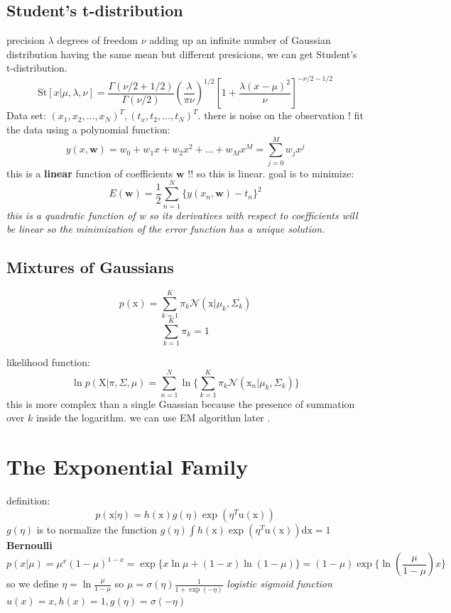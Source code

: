 \documentclass[a4paper]{book}
\renewcommand{\bf}{\mathbf}
\begin{document}
\subsection{Student's t-distribution}
precision $\lambda$    degrees of freedom $\nu$\newline
adding up an infinite number of Gaussian distribution having the same mean but different presicions, we can get Student's t-distribution.
$$\mathrm {St}[x|\mu,\lambda,\nu] = \frac{\Gamma(\nu/2+1/2)}{\Gamma(\nu/2)}{(\frac{\lambda}{\pi\nu})^{1/2}}[1+\frac{\lambda(x-\mu)^2}{\nu}]^{-\nu/2-1/2}$$
Data set: $(x_1,x_2,...,x_N)^T, (t_x,t_2,...,t_N)^T$.\newline
there is noise on the observation !
fit the data using a polynomial function:
\begin{equation}\label{2.1}
y(x, \textbf{w}) = w_0+w_1x+w_2x^2+\dots+w_Mx^M=\sum_{j=0}^Mw_jx^j
\end{equation}
this is a \textbf{linear} function of coefficients $\bf{w}$  !! so this is linear.
goal is to minimize:
\begin{equation}\label{2.2}
E(\textbf{w}) = \frac12\sum_{n=1}^N\{y(x_n,\textbf{w})-t_n\}^2
\end{equation}
\textit{this is a quadratic function of w so its derivatives with respect to coefficients will be linear so the minimization of the error function has a unique solution.}
\subsection{Mixtures of Gaussians}
$$p(\mathrm x) = \sum_{k=1}^K\pi_k\mathcal N(\mathrm x|\mu_k, \Sigma_k)$$
$$\sum_{k=1}^K \pi_k= 1$$

likelihood function:
$$\ln p(\mathrm X|\pi,\Sigma,\mu) = \sum_{n=1}^N\ln\{\sum_{k=1}^K\pi_k\mathcal N(\mathrm x_n|\mu_k,\Sigma_k)\}$$
this is more complex than a single Guassian because the presence of summation over $k$ inside the logarithm.  we can use EM algorithm later .

\section{The Exponential Family}
definition:
\begin{equation}\label{eq1.4.1}
  p(\mathrm x|\eta) = h(\mathrm x)g(\eta)\exp(\eta^T\mathrm u(\mathrm x))
\end{equation}
$g(\eta)$ is to normalize the function $g(\eta) \int h(\mathrm x)\exp(\eta^T\mathrm u(\mathrm x))\mathrm {dx} = 1$\newline
\textbf{Bernoulli}
\begin{equation}\label{1.4.2}
  p(x|\mu) =  \mu^x(1-\mu)^{1-x} = \exp\{x\ln\mu+(1-x)\ln(1-\mu)\} = (1-\mu)\exp\{\ln(\frac{\mu}{1-\mu})x\}
\end{equation}
so we define $\eta = \ln\frac{\mu}{1-\mu}$ so $\mu = \sigma(\eta) \frac{1}{1+\exp(-\eta)}$ \emph{logistic sigmoid function}
$u(x) = x, h(x) = 1, g(\eta) = \sigma(-\eta)$
\end{document}
